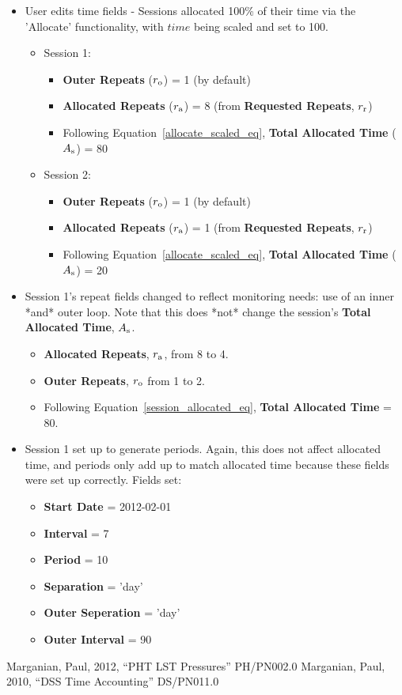 \documentclass{article}
\begin{document}
\begin{itemize}
\begin{itemize}
    \end{itemize}
\item User edits time fields - Sessions allocated 100\% of their time via the 'Allocate' functionality, with $time$ being scaled and set to 100.
    \begin{itemize}
    \item Session 1: 
        \begin{itemize}
        \item {\bf Outer Repeats} ($r_{\rm o}$) = 1 (by default)
        \item {\bf Allocated Repeats} ($r_{\rm a}$) = 8 (from {\bf Requested Repeats}, $r_{\rm r}$)
        \item Following Equation~\ref{allocate_scaled_eq}, {\bf Total Allocated Time} ($A_{\rm s}$) = 80
        \end{itemize}
    \item Session 2: 
        \begin{itemize}
        \item {\bf Outer Repeats} ($r_{\rm o}$) = 1 (by default)
        \item {\bf Allocated Repeats} ($r_{\rm a}$) = 1 (from {\bf Requested Repeats}, $r_{\rm r}$)
        \item Following Equation~\ref{allocate_scaled_eq}, {\bf Total Allocated Time} ($A_{\rm s}$) = 20
         \end{itemize}
     \end{itemize}
\item Session 1's repeat fields changed to reflect monitoring needs: use of an inner *and* outer loop.  Note that this does *not* change the session's {\bf Total Allocated Time}, $A_{\rm s}$.
    \begin{itemize}
    \item {\bf Allocated Repeats}, $r_{\rm a}$, from 8 to 4.
    \item {\bf Outer Repeats}, $r_{\rm o}$ from 1 to 2.
    \item Following Equation~\ref{session_allocated_eq}, {\bf Total Allocated Time} = 80.
    \end{itemize}
\item Session 1 set up to generate periods. Again, this does not affect allocated time, and periods only add up to match allocated time because these fields were set up correctly. Fields set:
    \begin{itemize}
    \item {\bf Start Date } = 2012-02-01
    \item {\bf Interval } = 7
    \item {\bf Period } = 10
    \item {\bf Separation } = 'day'
    \item {\bf Outer Seperation } = 'day'
    \item {\bf Outer Interval } = 90
    \end{itemize}
\end{itemize}

\begin{thebibliography}{}
  Marganian, Paul, 2012, ``PHT LST Pressures''
  PH/PN002.0
  Marganian, Paul, 2010, ``DSS Time Accounting''
  DS/PN011.0
\end{thebibliography}{}
\end{document}
